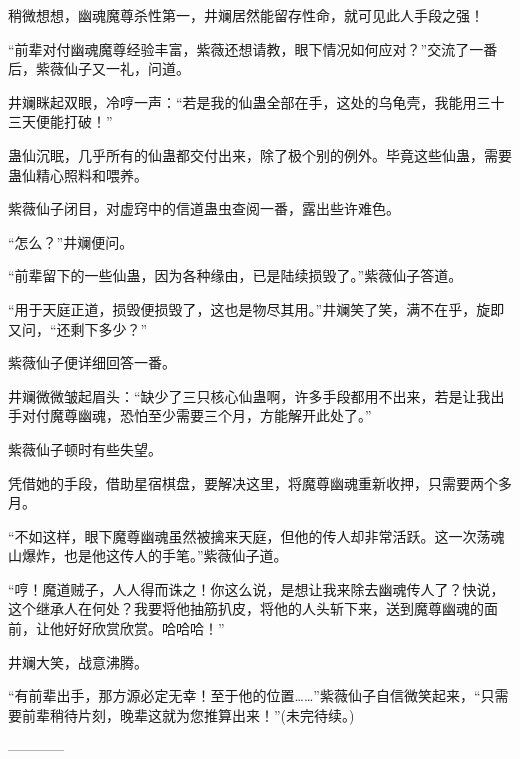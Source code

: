 \begin{this_body}
稍微想想，幽魂魔尊杀性第一，井斓居然能留存性命，就可见此人手段之强！

“前辈对付幽魂魔尊经验丰富，紫薇还想请教，眼下情况如何应对？”交流了一番后，紫薇仙子又一礼，问道。

井斓眯起双眼，冷哼一声：“若是我的仙蛊全部在手，这处的乌龟壳，我能用三十三天便能打破！”

蛊仙沉眠，几乎所有的仙蛊都交付出来，除了极个别的例外。毕竟这些仙蛊，需要蛊仙精心照料和喂养。

紫薇仙子闭目，对虚窍中的信道蛊虫查阅一番，露出些许难色。

“怎么？”井斓便问。

“前辈留下的一些仙蛊，因为各种缘由，已是陆续损毁了。”紫薇仙子答道。

“用于天庭正道，损毁便损毁了，这也是物尽其用。”井斓笑了笑，满不在乎，旋即又问，“还剩下多少？”

紫薇仙子便详细回答一番。

井斓微微皱起眉头：“缺少了三只核心仙蛊啊，许多手段都用不出来，若是让我出手对付魔尊幽魂，恐怕至少需要三个月，方能解开此处了。”

紫薇仙子顿时有些失望。

凭借她的手段，借助星宿棋盘，要解决这里，将魔尊幽魂重新收押，只需要两个多月。

“不如这样，眼下魔尊幽魂虽然被擒来天庭，但他的传人却非常活跃。这一次荡魂山爆炸，也是他这传人的手笔。”紫薇仙子道。

“哼！魔道贼子，人人得而诛之！你这么说，是想让我来除去幽魂传人了？快说，这个继承人在何处？我要将他抽筋扒皮，将他的人头斩下来，送到魔尊幽魂的面前，让他好好欣赏欣赏。哈哈哈！”

井斓大笑，战意沸腾。

“有前辈出手，那方源必定无幸！至于他的位置……”紫薇仙子自信微笑起来，“只需要前辈稍待片刻，晚辈这就为您推算出来！”(未完待续。)

------------

\end{this_body}

